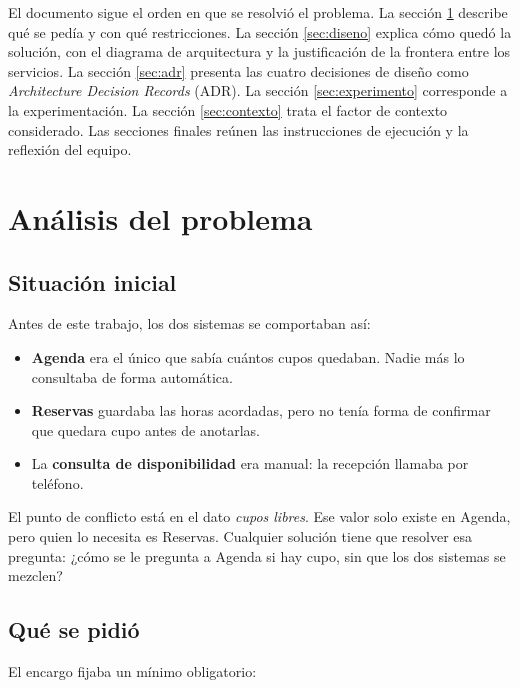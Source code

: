 \documentclass[12pt, a4paper]{article}
\begin{document}
El documento sigue el orden en que se resolvió el problema. La sección
\ref{sec:analisis} describe qué se pedía y con qué restricciones. La
sección \ref{sec:diseno} explica cómo quedó la solución, con el
diagrama de arquitectura y la justificación de la frontera entre los
servicios. La sección \ref{sec:adr} presenta las cuatro decisiones de
diseño como \textit{Architecture Decision Records} (ADR). La sección
\ref{sec:experimento} corresponde a la experimentación. La sección
\ref{sec:contexto} trata el factor de contexto considerado. Las secciones
finales reúnen las instrucciones de ejecución y la reflexión del equipo.


\newpage
\section{Análisis del problema}\label{sec:analisis}

\subsection{Situación inicial}

Antes de este trabajo, los dos sistemas se comportaban así:

\begin{itemize}[leftmargin=1.4cm]
    \item \textbf{Agenda} era el único que sabía cuántos cupos quedaban.
    Nadie más lo consultaba de forma automática.
    \item \textbf{Reservas} guardaba las horas acordadas, pero no tenía
    forma de confirmar que quedara cupo antes de anotarlas.
    \item La \textbf{consulta de disponibilidad} era manual: la recepción
    llamaba por teléfono.
\end{itemize}

El punto de conflicto está en el dato \emph{cupos libres}. Ese valor solo
existe en Agenda, pero quien lo necesita es Reservas. Cualquier solución
tiene que resolver esa pregunta: ¿cómo se le pregunta a Agenda si hay
cupo, sin que los dos sistemas se mezclen?

\subsection{Qué se pidió}

El encargo fijaba un mínimo obligatorio:
\end{document}
